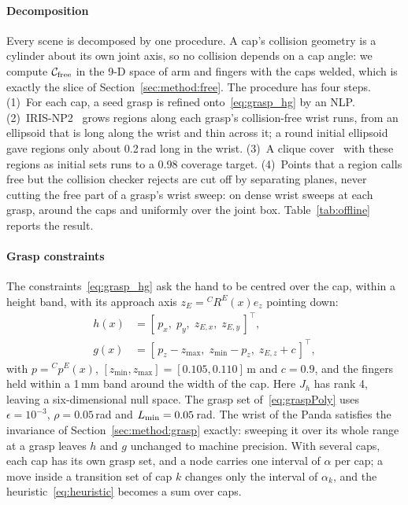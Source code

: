 \paragraph{Decomposition} Every scene is decomposed by one procedure. A cap's
collision geometry is a cylinder about its own joint axis, so no collision
depends on a cap angle: we compute $\mathcal{C}_{\mathrm{free}}$ in the 9-D space of arm and
fingers with the caps welded, which is exactly the slice of
Section~\ref{sec:method:free}. The procedure has four steps.
(1)~For each cap, a seed grasp is refined onto~\eqref{eq:grasp_hg} by an NLP.
(2)~IRIS-NP2~\cite{werner2024faster} grows regions along each grasp's
collision-free wrist runs, from an ellipsoid that is long along the wrist and
thin across it; a round initial ellipsoid gave regions only about 0.2\,rad
long in the wrist. (3)~A clique cover~\cite{werner2024approximating} with these
regions as initial sets runs to a 0.98 coverage target. (4)~Points that a
region calls free but the collision checker rejects are cut off by separating
planes, never cutting the free part of a grasp's wrist sweep: on dense wrist
sweeps at each grasp, around the caps and uniformly over the joint box.
Table~\ref{tab:offline} reports the result.

\paragraph{Grasp constraints} The constraints~\eqref{eq:grasp_hg} ask the
hand to be centred over the cap, within a height band, with its approach axis
$z_E={}^{C}R^{E}(x)e_z$ pointing down:
\begin{align}
  h(x) &= [\,p_x,\; p_y,\; z_{E,x},\; z_{E,y}\,]^\top, \label{eq:grasp_h}\\
  g(x) &= [\,p_z - z_{\max},\; z_{\min} - p_z,\; z_{E,z} + c\,]^\top, \label{eq:grasp_g}
\end{align}
with $p={}^{C}p^{E}(x)$, $[z_{\min},z_{\max}]=[0.105,0.110]$\,m and $c=0.9$,
and the fingers held within a 1\,mm band around the width of the cap. Here
$J_h$ has rank 4, leaving a six-dimensional null space. The grasp set
of~\eqref{eq:graspPoly} uses $\epsilon=10^{-3}$, $\rho=0.05$\,rad and
$L_{\min}=0.05$\,rad. The wrist of the Panda satisfies the invariance of
Section~\ref{sec:method:grasp} exactly: sweeping it over its whole range at a
grasp leaves $h$ and $g$ unchanged to machine precision. With several caps,
each cap has its own grasp set, and a node carries one interval of $\alpha$ per
cap; a move inside a transition set of cap $k$ changes only the interval of
$\alpha_k$, and the heuristic~\eqref{eq:heuristic} becomes a sum over caps.

